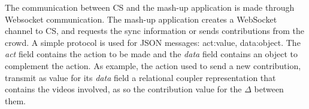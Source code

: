 The communication  between CS and the mash-up application is made through Websocket communication. The mash-up application creates a WebSocket channel to CS, and requests the sync information or sends contributions from the crowd. A simple protocol is used for JSON messages: {act:value, data:object}. The \textit{act} field contains the action to be made and the \textit{data} field contains an object to complement the action. As example, the action used to send a new contribution, transmit as value for its \textit{data} field a relational coupler representation that contains the videos involved, as so the contribution value for the $\Delta$ between them.

